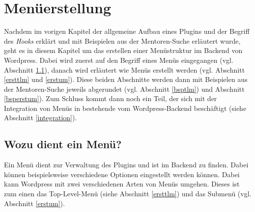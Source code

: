 \section{Menüerstellung}
Nachdem im vorigen Kapitel der allgemeine Aufbau eines Plugins und der Begriff des \emph{Hooks} erklärt und mit Beispielen aus der Mentoren-Suche erläutert wurde, geht es in diesem Kapitel um das erstellen einer Menüstruktur im Backend von Wordpress.\newline
Dabei wird zuerst auf den Begriff eines Menüs eingegangen (vgl. Abschnitt \ref{wasisteinmenue}), danach wird erläutert wie Menüs erstellt werden (vgl. Abschnitt \ref{ersttlm} und \ref{erstum}). Diese beiden Abschnitte werden dann mit Beispielen aus der Mentoren-Suche jeweils abgerundet (vgl. Abschnitt \ref{bsptlm}) und Abschnitt \ref{bsperstum}). Zum Schluss kommt dann noch ein Teil, der sich mit der Integration von Menüs in bestehende vom Wordpress-Backend beschäftigt (siehe Abschnitt \ref{integration}).
\subsection{Wozu dient ein Menü?}\label{wasisteinmenue}
Ein Menü dient zur Verwaltung des Plugins und ist im Backend zu finden. Dabei können beispielsweise verschiedene Optionen eingestellt werden können. Dabei kann Wordpress mit zwei verschiedenen Arten von Menüs umgehen. Dieses ist zum einen das Top-Level-Menü (siehe Abschnitt \ref{ersttlm}) und das Submenü (vgl. Abschnitt \ref{erstum}).
